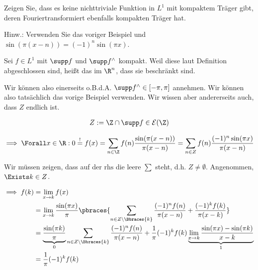 
\begin{exercise}

Zeigen Sie, dass es keine nichttriviale Funktion in $L^1$ mit kompaktem Träger gibt, deren Fouriertransformiert ebenfalls kompakten Träger hat.

Hinw.:
Verwenden Sie das voriger Beispiel und $\sin(\pi (x - n)) = (-1)^n \sin (\pi x)$.

\end{exercise}


\begin{solution}

Sei $f \in L^1$ mit $\supp f$ und $\supp f^\wedge$ kompakt.
Weil diese laut Definition abgeschlossen sind, heißt das im $\R^n$, dass sie beschränkt sind.

Wir können also einerseits o.B.d.A. $\supp f^\wedge \in [-\pi, \pi]$ annehmen.
Wir können also tatsächlich das vorige Beispiel verwenden.
Wir wissen aber andererseits auch, dass $Z$ endlich ist.

\begin{align*}
    Z := \Z \cap \supp f \in \mathcal{E}(\Z)
\end{align*}

\begin{align*}
    \implies
    \Forall x \in \R:
    0
    \stackrel{!}{=}
    f(x)
    =
    \sum_{n \in \Z}
    f(n)
    \frac
    {
        \sin(\pi (x - n))
    }{
        \pi (x - n)
    }
    =
    \sum_{n \in Z}
    f(n)
    \frac
    {
        (-1)^n
        \sin(\pi x)
    }{
        \pi (x - n)
    }
\end{align*}

Wir müssen zeigen, dass auf der $\text{rhs}$ die leere $\sum$ steht, d.h. $Z \neq \emptyset$.
Angenommen, $\Exists k \in Z$.

\begin{align*}
    \implies
    f(k)
    & =
    \lim_{x \to k}
    f(x) \\
    & =
    \lim_{x \to k}
    \frac{\sin(\pi x)}{\pi}
    \pbraces
    {
        \sum_{n \in Z \setminus \Bbraces{k}}
        \frac
        {
            (-1)^n
            f(n)
        }{
            \pi (x - n)
        }    
        +
        \frac
        {
            (-1)^k
            f(k)
        }{
            \pi (x - k)
        }
    } \\
    & =
    \underbrace
    {
        \frac{\sin(\pi k)}{\pi}
    }_0
    \sum_{n \in Z \setminus \Bbraces{k}}
    \frac
    {
        (-1)^n
        f(n)
    }{
        \pi (x - n)
    }
    +
    \frac{1}{\pi}
    (-1)^k
    f(k)
    \underbrace
    {
        \lim_{x \to k}
        \frac{\sin(\pi x) - \sin(\pi k)}{x - k}
    }_1 \\
    & =
    \frac{1}{\pi}
    (-1)^k
    f(k)
\end{align*}


\end{solution}
